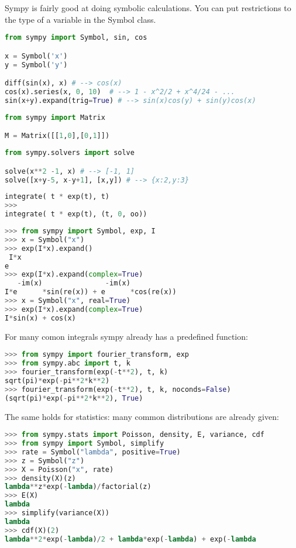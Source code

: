Sympy is fairly good at doing symbolic calculations. 
You can put restrictions to the type of a variable in the Symbol class. 

\begin{lstlisting}[language=python]
from sympy import Symbol, sin, cos

x = Symbol('x')
y = Symbol('y')

diff(sin(x), x) # --> cos(x)
cos(x).series(x, 0, 10)  # --> 1 - x^2/2 + x^4/24 - ...
sin(x+y).expand(trig=True) # --> sin(x)cos(y) + sin(y)cos(x)
\end{lstlisting}

\begin{lstlisting}[language=python]
from sympy import Matrix

M = Matrix([[1,0],[0,1]])
\end{lstlisting}

\begin{lstlisting}[language=python]
from sympy.solvers import solve

solve(x**2 -1, x) # --> [-1, 1]
solve([x+y-5, x-y+1], [x,y]) # --> {x:2,y:3}
\end{lstlisting}

\begin{lstlisting}[language=python]
integrate( t * exp(t), t)
>>> 
integrate( t * exp(t), (t, 0, oo))
\end{lstlisting}

\begin{lstlisting}[language=python]
>>> from sympy import Symbol, exp, I
>>> x = Symbol("x")
>>> exp(I*x).expand()
 I*x
e
>>> exp(I*x).expand(complex=True)
   -im(x)               -im(x)
I*e      *sin(re(x)) + e      *cos(re(x))
>>> x = Symbol("x", real=True)
>>> exp(I*x).expand(complex=True)
I*sin(x) + cos(x)
\end{lstlisting}

For many comon integrals sympy already has a predefined function: 

\begin{lstlisting}[language=python]
>>> from sympy import fourier_transform, exp
>>> from sympy.abc import t, k
>>> fourier_transform(exp(-t**2), t, k)
sqrt(pi)*exp(-pi**2*k**2)
>>> fourier_transform(exp(-t**2), t, k, noconds=False)
(sqrt(pi)*exp(-pi**2*k**2), True)
\end{lstlisting}

The same holds for statistics: many common distributions are already given: 

\begin{lstlisting}[language=python]
>>> from sympy.stats import Poisson, density, E, variance, cdf
>>> from sympy import Symbol, simplify
>>> rate = Symbol("lambda", positive=True)
>>> z = Symbol("z")
>>> X = Poisson("x", rate)
>>> density(X)(z)
lambda**z*exp(-lambda)/factorial(z)
>>> E(X)
lambda
>>> simplify(variance(X))
lambda
>>> cdf(X)(2)
lambda**2*exp(-lambda)/2 + lambda*exp(-lambda) + exp(-lambda
\end{lstlisting}


